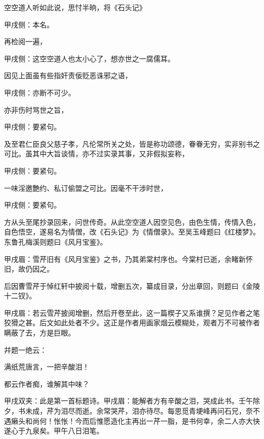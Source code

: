 \begin{parag}
    空空道人听如此说，思忖半晌，将《石头记》\begin{note}甲戌侧：本名。\end{note}再检阅一遍，\begin{note}甲戌侧：这空空道人也太小心了，想亦世之一腐儒耳。\end{note}因见上面虽有些指奸责佞贬恶诛邪之语，\begin{note}甲戌侧：亦断不可少。\end{note}亦非伤时骂世之旨，\begin{note}甲戌侧：要紧句。\end{note}及至君仁臣良父慈子孝，凡伦常所关之处，皆是称功颂德，眷眷无穷，实非别书之可比。虽其中大旨谈情，亦不过实录其事，又非假拟妄称，\begin{note}甲戌侧：要紧句。\end{note}一味淫邀艶约、私订偷盟之可比。因毫不干涉时世，\begin{note}甲戌侧：要紧句。\end{note}方从头至尾抄录回来，问世传奇。从此空空道人因空见色，由色生情，传情入色，自色悟空，遂易名为情僧，改《石头记》为《情僧录》。至吴玉峰题曰《红楼梦》。东鲁孔梅溪则题曰《风月宝鉴》。\begin{note}甲戌眉：雪芹旧有《风月宝鉴》之书，乃其弟棠村序也。今棠村已逝，余睹新怀旧，故仍因之。\end{note}后因曹雪芹于悼红轩中披阅十载，增删五次，纂成目录，分出章回，则题曰《金陵十二钗》。\begin{note}甲戌眉：若云雪芹披阅增删，然后开卷至此，这一篇楔子又系谁撰？足见作者之笔狡猾之甚。后文如此处者不少。这正是作者用画家烟云模糊处，观者万不可被作者瞒蔽了去，方是巨眼。\end{note}幷题一绝云：
\end{parag}


\begin{poem}
    \begin{pl}满纸荒唐言，一把辛酸泪！\end{pl}

    \begin{pl}都云作者痴，谁解其中味？\end{pl}
    \begin{note}甲戌双夹：此是第一首标题诗。甲戌眉：能解者方有辛酸之泪，哭成此书。壬午除夕，书未成，芹为泪尽而逝。余常哭芹，泪亦待尽。每思觅青埂峰再问石兄，奈不遇癞头和尚何！怅怅！今而后惟愿造化主再出一芹一脂，是书何幸，余二人亦大快遂心于九泉矣。甲午八日泪笔。\end{note}
\end{poem}


